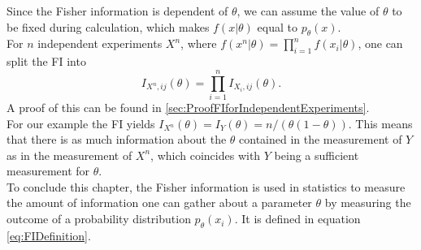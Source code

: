 Since the Fisher information is dependent of $\theta$, we can assume the value of $\theta$ to be fixed during calculation, which makes $f(x|\theta)$ equal to $p_\theta(x)$.\\ 
For $n$ independent experiments $X^n$, where $f(x^n|\theta) = \prod_{i=1}^n f(x_i|\theta)$, one can split the FI into 
\begin{equation}\label{eq:FIforIndependentExperiments}
	I_{X^n,ij}(\theta) = \prod_{i=1}^n I_{X_i,ij}(\theta).
\end{equation}
A proof of this can be found in \cref{sec:ProofFIforIndependentExperiments}.\\
For our example the FI yields $I_{X^n}(\theta) = I_{Y}(\theta) = n/(\theta(1-\theta))$\cite{StatisticFisherInfoTutorial}. This means that there is as much information about the $\theta$ contained in the measurement of $Y$ as in the measurement of $X^n$, which coincides with $Y$ being a sufficient measurement for $\theta$. \\
To conclude this chapter, the Fisher information is used in statistics to measure the amount of information one can gather about a parameter $\theta$ by measuring the outcome of a probability distribution $p_\theta(x_i)$. It is defined in equation \cref{eq:FIDefinition}.
